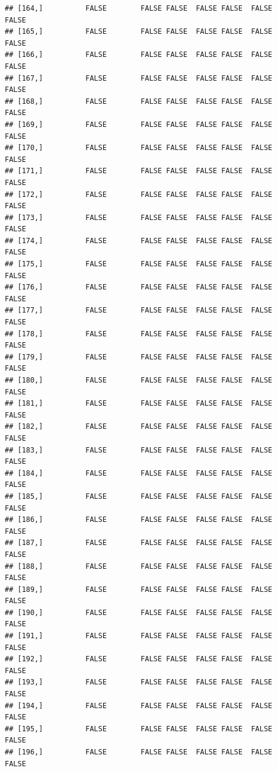 \documentclass[
  english,
  man,floatsintext]{apa6}
\begin{document}
\begin{verbatim}
## [164,]          FALSE        FALSE FALSE  FALSE FALSE  FALSE            FALSE
## [165,]          FALSE        FALSE FALSE  FALSE FALSE  FALSE            FALSE
## [166,]          FALSE        FALSE FALSE  FALSE FALSE  FALSE            FALSE
## [167,]          FALSE        FALSE FALSE  FALSE FALSE  FALSE            FALSE
## [168,]          FALSE        FALSE FALSE  FALSE FALSE  FALSE            FALSE
## [169,]          FALSE        FALSE FALSE  FALSE FALSE  FALSE            FALSE
## [170,]          FALSE        FALSE FALSE  FALSE FALSE  FALSE            FALSE
## [171,]          FALSE        FALSE FALSE  FALSE FALSE  FALSE            FALSE
## [172,]          FALSE        FALSE FALSE  FALSE FALSE  FALSE            FALSE
## [173,]          FALSE        FALSE FALSE  FALSE FALSE  FALSE            FALSE
## [174,]          FALSE        FALSE FALSE  FALSE FALSE  FALSE            FALSE
## [175,]          FALSE        FALSE FALSE  FALSE FALSE  FALSE            FALSE
## [176,]          FALSE        FALSE FALSE  FALSE FALSE  FALSE            FALSE
## [177,]          FALSE        FALSE FALSE  FALSE FALSE  FALSE            FALSE
## [178,]          FALSE        FALSE FALSE  FALSE FALSE  FALSE            FALSE
## [179,]          FALSE        FALSE FALSE  FALSE FALSE  FALSE            FALSE
## [180,]          FALSE        FALSE FALSE  FALSE FALSE  FALSE            FALSE
## [181,]          FALSE        FALSE FALSE  FALSE FALSE  FALSE            FALSE
## [182,]          FALSE        FALSE FALSE  FALSE FALSE  FALSE            FALSE
## [183,]          FALSE        FALSE FALSE  FALSE FALSE  FALSE            FALSE
## [184,]          FALSE        FALSE FALSE  FALSE FALSE  FALSE            FALSE
## [185,]          FALSE        FALSE FALSE  FALSE FALSE  FALSE            FALSE
## [186,]          FALSE        FALSE FALSE  FALSE FALSE  FALSE            FALSE
## [187,]          FALSE        FALSE FALSE  FALSE FALSE  FALSE            FALSE
## [188,]          FALSE        FALSE FALSE  FALSE FALSE  FALSE            FALSE
## [189,]          FALSE        FALSE FALSE  FALSE FALSE  FALSE            FALSE
## [190,]          FALSE        FALSE FALSE  FALSE FALSE  FALSE            FALSE
## [191,]          FALSE        FALSE FALSE  FALSE FALSE  FALSE            FALSE
## [192,]          FALSE        FALSE FALSE  FALSE FALSE  FALSE            FALSE
## [193,]          FALSE        FALSE FALSE  FALSE FALSE  FALSE            FALSE
## [194,]          FALSE        FALSE FALSE  FALSE FALSE  FALSE            FALSE
## [195,]          FALSE        FALSE FALSE  FALSE FALSE  FALSE            FALSE
## [196,]          FALSE        FALSE FALSE  FALSE FALSE  FALSE            FALSE

\end{verbatim}
\end{document}

